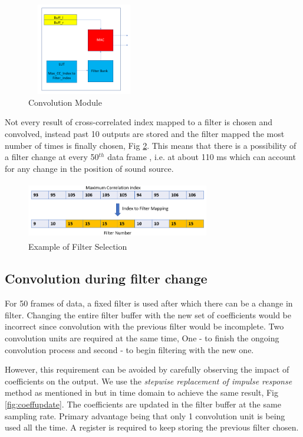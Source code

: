 \documentclass[conference]{IEEEtran}
\begin{document}
\begin{figure}
    \centering
    \includegraphics[width = 5cm, height = 4cm]{conv_module.png}
    \caption{Convolution Module}
    \label{fig:conv_module}
\end{figure}

Not every result of cross-correlated index mapped to a filter is chosen and convolved, instead past 10 outputs are stored and the filter mapped the most number of times is finally chosen, Fig \ref{fig:past10}. This means that there is a possibility of a filter change at every 50$^{th}$ data frame , i.e. at about 110 ms which can account for any change in the position of sound source.

\begin{figure}
    \centering
    \includegraphics[width = 8cm, height = 2.5cm]{index_2_filter.png}
    \caption{Example of Filter Selection}
    \label{fig:past10}
\end{figure}

\subsection{Convolution during filter change}

For 50 frames of data, a fixed filter is used after which there can be a change in filter. Changing the entire filter buffer with the new set of coefficients would be incorrect since convolution with the previous filter would be incomplete. Two convolution units are required at the same time, One - to finish the ongoing convolution process and second - to begin filtering with the new one.

However, this requirement can be avoided by carefully observing the impact of coefficients on the output. We use the \textit{stepwise replacement of impulse response} method as mentioned in \cite{live} but in time domain to achieve the same result, Fig \ref{fig:coeffupdate}. The coefficients are updated in the filter buffer at the same sampling rate. Primary advantage being that only 1 convolution unit is being used all the time. A register is required to keep storing the previous filter chosen. 
\end{document}
